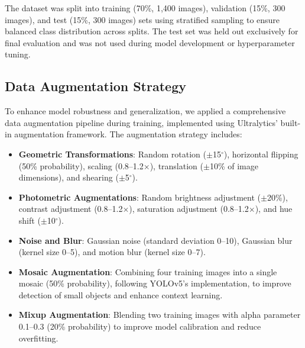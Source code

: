 \begin{table}[!t]
\caption{Durian Leaf Disease Dataset Statistics}
\label{tab:dataset_stats}
\centering
{}
\end{table}

The dataset was split into training (70\%, 1,400 images), validation (15\%, 300 images), and test (15\%, 300 images) sets using stratified sampling to ensure balanced class distribution across splits. The test set was held out exclusively for final evaluation and was not used during model development or hyperparameter tuning.

\subsection{Data Augmentation Strategy}

To enhance model robustness and generalization, we applied a comprehensive data augmentation pipeline during training, implemented using Ultralytics' built-in augmentation framework. The augmentation strategy includes:

\begin{itemize}
\item \textbf{Geometric Transformations}: Random rotation ($\pm$15$^\circ$), horizontal flipping (50\% probability), scaling (0.8--1.2$\times$), translation ($\pm$10\% of image dimensions), and shearing ($\pm$5$^\circ$).
\item \textbf{Photometric Augmentations}: Random brightness adjustment ($\pm$20\%), contrast adjustment (0.8--1.2$\times$), saturation adjustment (0.8--1.2$\times$), and hue shift ($\pm$10$^\circ$).
\item \textbf{Noise and Blur}: Gaussian noise (standard deviation 0--10), Gaussian blur (kernel size 0--5), and motion blur (kernel size 0--7).
\item \textbf{Mosaic Augmentation}: Combining four training images into a single mosaic (50\% probability), following YOLOv5's implementation, to improve detection of small objects and enhance context learning.
\item \textbf{Mixup Augmentation}: Blending two training images with alpha parameter 0.1--0.3 (20\% probability) to improve model calibration and reduce overfitting.
\end{itemize}

